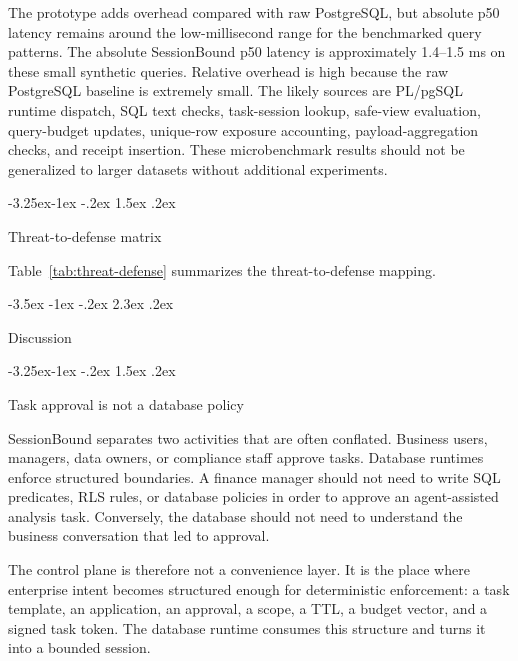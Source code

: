 \documentclass[10pt,twocolumn]{article}
\makeatletter
\renewcommand\section{\@startsection{section}{1}{\z@}%
  {-3.5ex \@plus -1ex \@minus -.2ex}%
  {2.3ex \@plus .2ex}%
  {\normalfont\Large\bfseries\raggedright}}
\renewcommand\subsection{\@startsection{subsection}{2}{\z@}%
  {-3.25ex\@plus -1ex \@minus -.2ex}%
  {1.5ex \@plus .2ex}%
  {\normalfont\large\bfseries\raggedright}}
\makeatother
\begin{document}
The prototype adds overhead compared with raw PostgreSQL, but absolute
p50 latency remains around the low-millisecond range for the benchmarked
query patterns. The absolute SessionBound p50 latency is approximately
1.4--1.5 ms on these small synthetic queries. Relative overhead is high
because the raw PostgreSQL baseline is extremely small. The likely
sources are PL/pgSQL runtime dispatch, SQL text checks, task-session
lookup, safe-view evaluation, query-budget updates, unique-row exposure
accounting, payload-aggregation checks, and receipt insertion. These
microbenchmark results should not be generalized to larger datasets
without additional experiments.

\hypertarget{threat-to-defense-matrix}{%
\subsection{Threat-to-defense
matrix}\label{threat-to-defense-matrix}}

Table~\ref{tab:threat-defense} summarizes the threat-to-defense
mapping.


\hypertarget{discussion}{%
\section{Discussion}\label{discussion}}

\hypertarget{task-approval-is-not-a-database-policy}{%
\subsection{Task approval is not a database
policy}\label{task-approval-is-not-a-database-policy}}

SessionBound separates two activities that are often conflated.
Business users, managers, data owners, or compliance staff approve
tasks. Database runtimes enforce structured boundaries. A finance
manager should not need to write SQL predicates, RLS rules, or database
policies in order to approve an agent-assisted analysis task.
Conversely, the database should not need to understand the business
conversation that led to approval.

The control plane is therefore not a convenience layer. It is the place
where enterprise intent becomes structured enough for deterministic
enforcement: a task template, an application, an approval, a scope, a
TTL, a budget vector, and a signed task token. The database runtime
consumes this structure and turns it into a bounded session.
\end{document}
